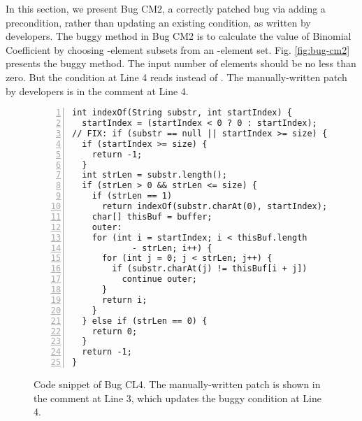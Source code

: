 In this section, we present Bug CM2, a correctly patched bug via adding a precondition, rather than updating an existing condition, as written by developers. 
The buggy method in Bug CM2 is to calculate the value of Binomial Coefficient by choosing -element subsets from an -element set. Fig. \ref{fig:bug-cm2} presents the buggy method. The input number of elements  should be no less than zero. But the condition at Line 4 reads  instead of . The manually-written patch by developers is in the  comment at Line 4. 

\begin{figure}[!t]
\centering
\noindent\begin{minipage}{0.4\textwidth}
\begin{lstlisting}[numbers=left]
int indexOf(String substr, int startIndex) {
  startIndex = (startIndex < 0 ? 0 : startIndex);
// FIX: if (substr == null || startIndex >= size) {
  if (startIndex >= size) {
    return -1;
  }
  int strLen = substr.length();
  if (strLen > 0 && strLen <= size) {
    if (strLen == 1) 
      return indexOf(substr.charAt(0), startIndex);
    char[] thisBuf = buffer;
    outer:
    for (int i = startIndex; i < thisBuf.length
            - strLen; i++) {
      for (int j = 0; j < strLen; j++) {
        if (substr.charAt(j) != thisBuf[i + j]) 
          continue outer;
      }
      return i;
    }
  } else if (strLen == 0) {
    return 0;
  }
  return -1;
}
\end{lstlisting}

\end{minipage}
\caption{Code snippet of Bug CL4. The manually-written patch is shown in the  comment at Line 3, which updates the buggy \ourif condition at Line 4.}
\label{fig:bug-cl4}
\end{figure}

\begin{table}[!t]
\centering
\caption{Sample of test cases for Bug CL4}
\label{tab:test-cl4}

\end{table}

